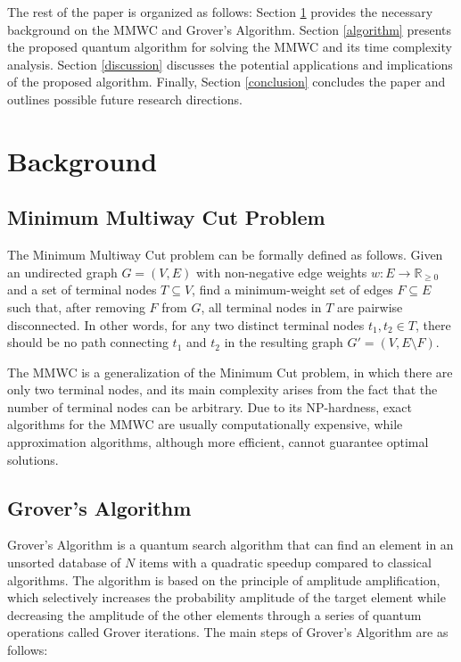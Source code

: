 The rest of the paper is organized as follows: Section \ref{background} provides the necessary background on the MMWC and Grover's Algorithm. Section \ref{algorithm} presents the proposed quantum algorithm for solving the MMWC and its time complexity analysis. Section \ref{discussion} discusses the potential applications and implications of the proposed algorithm. Finally, Section \ref{conclusion} concludes the paper and outlines possible future research directions.

\section{Background}
\label{background}

\subsection{Minimum Multiway Cut Problem}

The Minimum Multiway Cut problem can be formally defined as follows. Given an undirected graph $G = (V, E)$ with non-negative edge weights $w: E \rightarrow \mathbb{R}_{\geq 0}$ and a set of terminal nodes $T \subseteq V$, find a minimum-weight set of edges $F \subseteq E$ such that, after removing $F$ from $G$, all terminal nodes in $T$ are pairwise disconnected. In other words, for any two distinct terminal nodes $t_1, t_2 \in T$, there should be no path connecting $t_1$ and $t_2$ in the resulting graph $G' = (V, E \setminus F)$.

The MMWC is a generalization of the Minimum Cut problem, in which there are only two terminal nodes, and its main complexity arises from the fact that the number of terminal nodes can be arbitrary. Due to its NP-hardness, exact algorithms for the MMWC are usually computationally expensive, while approximation algorithms, although more efficient, cannot guarantee optimal solutions.

\subsection{Grover's Algorithm}

Grover's Algorithm is a quantum search algorithm that can find an element in an unsorted database of $N$ items with a quadratic speedup compared to classical algorithms. The algorithm is based on the principle of amplitude amplification, which selectively increases the probability amplitude of the target element while decreasing the amplitude of the other elements through a series of quantum operations called Grover iterations. The main steps of Grover's Algorithm are as follows:

